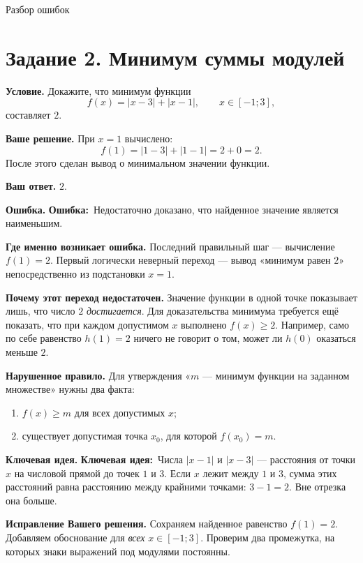 \documentclass[a4paper,12pt]{article}
\newcommand{\labeltext}[1]{\par\noindent\textbf{\color{ink}#1}\quad}
\newcommand{\err}{\textbf{\color{errorred}Ошибка:}\ }
\newcommand{\idea}{\textbf{\color{keyblue}Ключевая идея:}\ }
\begin{document}
\thispagestyle{empty}
\vspace*{.34\textheight}
\begin{center}
{\Huge\color{accent}Разбор ошибок}
\end{center}
\clearpage

\label{task:2}
\section*{Задание 2. Минимум суммы модулей}
\labeltext{Условие.}
Докажите, что минимум функции
\[
f(x)=|x-3|+|x-1|,\qquad x\in[-1;3],
\]
составляет $2$.

\labeltext{Ваше решение.}
При $x=1$ вычислено:
\[
f(1)=|1-3|+|1-1|=2+0=2.
\]
После этого сделан вывод о минимальном значении функции.

\labeltext{Ваш ответ.} $2$.

\labeltext{Ошибка.} \err Недостаточно доказано, что найденное значение является наименьшим.

\labeltext{Где именно возникает ошибка.}
Последний правильный шаг --- вычисление $f(1)=2$. Первый логически неверный переход --- вывод «минимум равен $2$» непосредственно из подстановки $x=1$.

\labeltext{Почему этот переход недостаточен.}
Значение функции в одной точке показывает лишь, что число $2$ \emph{достигается}. Для доказательства минимума требуется ещё показать, что при каждом допустимом $x$ выполнено $f(x)\ge 2$. Например, само по себе равенство $h(1)=2$ ничего не говорит о том, может ли $h(0)$ оказаться меньше $2$.

\labeltext{Нарушенное правило.}
Для утверждения «$m$ --- минимум функции на заданном множестве» нужны два факта:
\begin{enumerate}[leftmargin=*,nosep]
\item $f(x)\ge m$ для всех допустимых $x$;
\item существует допустимая точка $x_0$, для которой $f(x_0)=m$.
\end{enumerate}

\labeltext{Ключевая идея.}
\idea Числа $|x-1|$ и $|x-3|$ --- расстояния от точки $x$ на числовой прямой до точек $1$ и $3$. Если $x$ лежит между $1$ и $3$, сумма этих расстояний равна расстоянию между крайними точками: $3-1=2$. Вне отрезка она больше.

\labeltext{Исправление Вашего решения.}
Сохраняем найденное равенство $f(1)=2$. Добавляем обоснование для \emph{всех} $x\in[-1;3]$. Проверим два промежутка, на которых знаки выражений под модулями постоянны.
\end{document}
